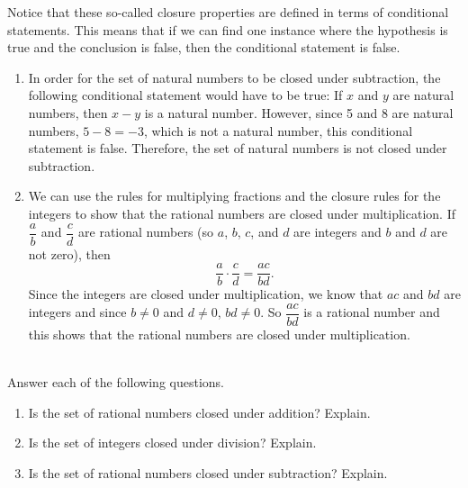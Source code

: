 Notice that these so-called closure properties are defined in terms of conditional statements.  This means that if we can find one instance where the hypothesis is true and the conclusion is false, then the conditional statement is false.

\begin{example}\label{ex:closure} \hfill 
\begin{enumerate}
\item In order for the set of natural numbers to be closed under subtraction, the following conditional statement would have to be true:  If $x$ and $y$ are natural numbers, then $x - y$ is a natural number.  However, since 5 and 8 are natural numbers,  $5 - 8 = -3$, which is not a natural number, this conditional statement is false.  Therefore, the set of natural numbers is not closed under subtraction.


\item We can use the rules for multiplying fractions and the closure rules for the integers to show that the rational numbers are closed under multiplication.  If $\dfrac{a}{b}$ and $\dfrac{c}{d}$ are rational numbers (so $a$, $b$, $c$, and $d$ are integers and $b$ and $d$ are not zero), then
\[
\frac{a}{b} \cdot \frac{c}{d} = \frac{ac}{bd}.
\]
Since the integers are closed under multiplication, we know that $ac$ and $bd$ are integers and since $b \ne 0$ and $d \ne 0$, $bd \ne 0$.  So $\dfrac{ac}{bd}$ is a rational number and this shows that the rational numbers are closed under multiplication.
\end{enumerate}
\end{example}
\hbreak

\begin{prog}\label{pr:closure} \hfill \\
Answer each of the following questions.
\begin{enumerate}
\item Is the set of rational numbers closed under addition?  Explain.

\item Is the set of integers closed under division?  Explain.

\item Is the set of rational numbers closed under subtraction?  Explain.


\end{enumerate}
\end{prog}
%
\hbreak
\newpage

\endinput
